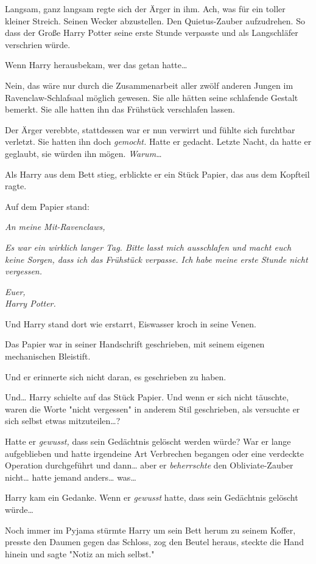 {Langsam, ganz langsam regte sich der Ärger in ihm. Ach, was für ein toller kleiner Streich. Seinen Wecker abzustellen. Den Quietus-Zauber aufzudrehen. So dass der Große Harry Potter seine erste Stunde verpasste und als Langschläfer verschrien würde.

Wenn Harry herausbekam, wer das getan hatte…

Nein, das wäre nur durch die Zusammenarbeit aller zwölf anderen Jungen im Ravenclaw-Schlafsaal möglich gewesen. Sie alle hätten seine schlafende Gestalt bemerkt. Sie alle hatten ihn das Frühstück verschlafen lassen.

Der Ärger verebbte, stattdessen war er nun verwirrt und fühlte sich furchtbar verletzt. Sie hatten ihn doch \emph{gemocht.} Hatte er gedacht. Letzte Nacht, da hatte er geglaubt, sie würden ihn mögen. \emph{Warum…}

Als Harry aus dem Bett stieg, erblickte er ein Stück Papier, das aus dem Kopfteil ragte.

Auf dem Papier stand:

\emph{An meine Mit-Ravenclaws,}

\emph{Es war ein wirklich langer Tag. Bitte lasst mich ausschlafen und macht euch keine Sorgen, dass ich das Frühstück verpasse. Ich habe meine erste Stunde nicht vergessen.}

\emph{Euer,\\ Harry Potter.}

Und Harry stand dort wie erstarrt, Eiswasser kroch in seine Venen.

Das Papier war in seiner Handschrift geschrieben, mit seinem eigenen mechanischen Bleistift.

Und er erinnerte sich nicht daran, es geschrieben zu haben.

Und… Harry schielte auf das Stück Papier. Und wenn er sich nicht täuschte, waren die Worte "nicht vergessen" in anderem Stil geschrieben, als versuchte er sich selbst etwas mitzuteilen…?

Hatte er \emph{gewusst,} dass sein Gedächtnis gelöscht werden würde? War er lange aufgeblieben und hatte irgendeine Art Verbrechen begangen oder eine verdeckte Operation durchgeführt und dann… aber er \emph{beherrschte} den Obliviate-Zauber nicht… hatte jemand anders… was…

Harry kam ein Gedanke. Wenn er \emph{gewusst} hatte, dass sein Gedächtnis gelöscht würde…

Noch immer im Pyjama stürmte Harry um sein Bett herum zu seinem Koffer, presste den Daumen gegen das Schloss, zog den Beutel heraus, steckte die Hand hinein und sagte "Notiz an mich selbst."

}
